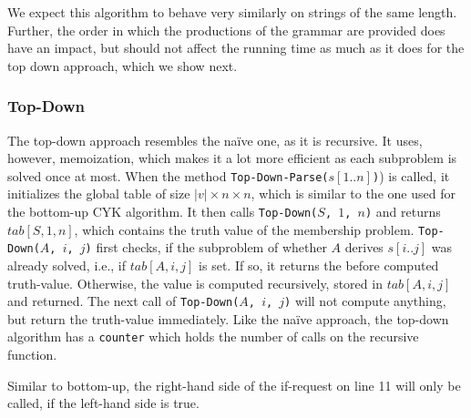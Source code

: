 We expect this algorithm to behave very similarly on strings of the same length.
Further, the order in which the productions of the grammar are provided does have an impact, but should not affect the running time as much as it does for the top down approach, which we show next.

\subsubsection{Top-Down}
\label{sec:top_down}
The top-down approach resembles the na\"{i}ve one, as it is recursive.
It uses, however, memoization, which makes it a lot more efficient as each subproblem is solved once at most.
When the method \texttt{Top-Down-Parse($s[1..n]$)}) is called, it initializes the global table of size $|v|\times n\times n$, which is similar to the one used for the bottom-up CYK algorithm.
It then calls \texttt{Top-Down($S$, $1$, $n$)} and returns $tab[S,1,n]$, which contains the truth value of the membership problem.
\texttt{Top-Down($A$, $i$, $j$)} first checks, if the subproblem of whether $A$ derives $s[i..j]$ was already solved, i.e., if $tab[A,i,j]$ is set.
If so, it returns the before computed truth-value.
Otherwise, the value is computed recursively, stored in $tab[A,i,j]$ and returned.
The next call of \texttt{Top-Down($A$, $i$, $j$)} will not compute anything, but return the truth-value immediately.
Like the na\"{i}ve approach, the top-down algorithm has a \texttt{counter} which holds the number of calls on the recursive function.

Similar to bottom-up, the right-hand side of the if-request on line 11 will only be called, if the left-hand side is true. 

